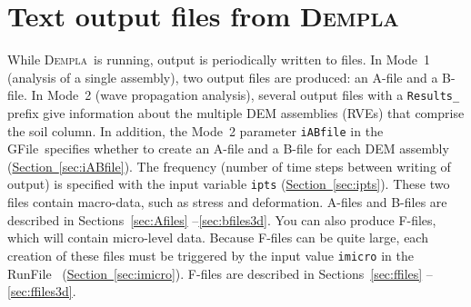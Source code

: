 \documentclass[letterpaper,11pt]{article}
\newcommand{\Dempla}{\textsc{Dempla}}
\newcommand{\RunFile}{\textsf{RunFile}}
\newcommand{\GFile}{\textsf{GFile}}
\begin{document}
\section{Text output files from \Dempla}\label{sec:MacroOutput}
While \Dempla\ is running,
output is periodically written to files.
In Mode~1 (analysis of a single assembly),
two output files are produced:
an A-file and a B-file.
In Mode~2 (wave propagation analysis),
several output files with a \texttt{Results\_} prefix
give information about the multiple DEM assemblies (RVEs)
that comprise the soil column.
In addition, the Mode~2 parameter \texttt{iABfile} in
the \GFile\ specifies whether to create an
A-file and a B-file for each DEM assembly
(\hyperref[sec:iABfile]{Section~\ref*{sec:iABfile}}).
%
The frequency (number of time steps between writing of output)
is specified with the input variable
\texttt{ipts}
(\hyperref[sec:ipts]{Section~\ref*{sec:ipts}}).
These two files contain macro-data, such as stress and
deformation.
A-files and B-files are described in 
Sections~\hyperref[sec:Afiles]{\ref*{sec:Afiles}}%
--\hyperref[sec:bfiles3d]{\ref*{sec:bfiles3d}}.
%
You can also produce F-files, which will contain micro-level data.
Because F-files can be quite large, each creation of these files must
be triggered by the input value \texttt{imicro} in the
\RunFile\ %
(\hyperref[sec:imicro]{Section~\ref*{sec:imicro}}).
F-files are described in
Sections~\hyperref[sec:ffiles]{\ref*{sec:ffiles}}%
--\hyperref[sec:ffiles3d]{\ref*{sec:ffiles3d}}.
%
\end{document}
